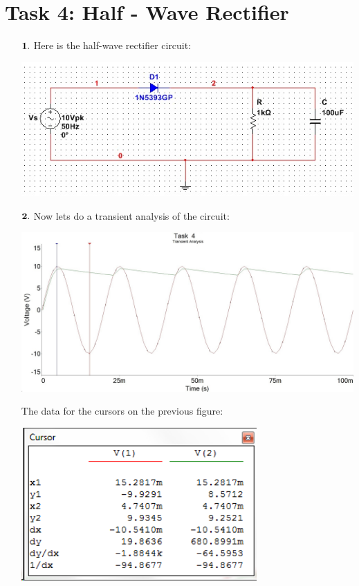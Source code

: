 \documentclass[11pt,a4paper]{article}
\begin{document}
\section*{Task 4: Half - Wave Rectifier}


\begin{enumerate}
  \item[$\bold{1.}$]
  Here is the half-wave rectifier circuit:
  \\
  
	\begin{minipage}{\linewidth}
    	\centering
        \includegraphics[width=13cm]{4_1.jpg}
    \end{minipage}
    
  
  \item[$\bold{2.}$]
  Now lets do a transient analysis of the circuit:
  \\
	\begin{minipage}{\linewidth}
    	\centering
        \includegraphics[width=13cm]{4_2.jpg}
    \end{minipage}


    The data for the cursors on the previous figure:\\
    
    \begin{minipage}{\linewidth}
    	\centering
        \includegraphics[width=9cm]{table_4_1.png}
    \end{minipage}
    

\end{enumerate}
\end{document}

